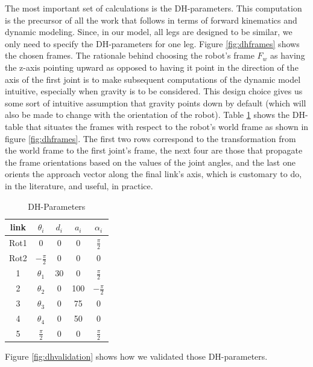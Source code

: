 \documentclass[letterpaper, 10 pt, conference]{ieeeconf}  %
\begin{document}
The most important set of calculations is the DH-parameters. This computation is the precursor of all the work that follows in terms of forward kinematics and dynamic modeling. Since, in our model, all legs are designed to be similar, we only need to specify the DH-parameters for one leg. Figure \ref{fig:dhframes} shows the chosen frames. The rationale behind choosing the robot's frame $F_w$ as having the z-axis pointing upward as opposed to having it point in the direction of the axis of the first joint is to make subsequent computations of the dynamic model intuitive, especially when gravity is to be considered. This design choice gives us some sort of intuitive assumption that gravity points down by default (which will also be made to change with the orientation of the robot).
Table \ref{tab:dhparams} shows the DH-table that situates the frames with respect to the robot's world frame as shown in figure \ref{fig:dhframes}. The first two rows correspond to the transformation from the world frame to the first joint's frame, the next four are those that propagate the frame orientations based on the values of the joint angles, and the last one orients the approach vector along the final link's axis, which is customary to do, in the literature, and useful, in practice.

\begin{table}
\caption{DH-Parameters}
\label{tab:dhparams}
\begin{center}
\begin{tabular}{ | c | c | c | c | c |} 
\hline
link & $\theta_i$ & $d_i$ & $a_i$ & $\alpha_i$ \\
\hline
Rot1 & 0 & 0 & 0 & $\frac{\pi}{2}$ \\
\hline
Rot2 & $-\frac{\pi}{2}$ & 0 & 0 & 0 \\
\hline
1    & $\theta_1$ & 30  & 0  & $\frac{\pi}{2}$  \\
\hline
2    & $\theta_2$  & 0  & 100 & $-\frac{\pi}{2}$  \\
\hline
3    & $\theta_3$  & 0  & 75  & 0 \\
\hline
4    & $\theta_4$  & 0  & 50  & 0 \\
\hline
5    & $\frac{\pi}{2}$  & 0  & 0  &  $\frac{\pi}{2}$ \\
\hline
\end{tabular}
\end{center}
\end{table}

Figure \ref{fig:dhvalidation} shows how we validated those DH-parameters.
\end{document}
